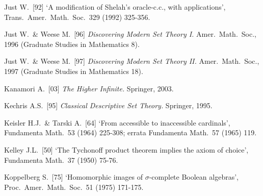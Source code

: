 {%


Just W.\ [92] `A modification of Shelah's oracle-c.c., with
applications', Trans.\ Amer.\ Math.\ Soc.\ 329 (1992) 325-356.
\cmmnt{[527M.]}


Just W.\ \& Weese M.\ [96] {\it Discovering Modern Set Theory I.}
Amer.\ Math.\ Soc., 1996 (Graduate Studies in Mathematics 8).
\cmmnt{[{\it Intro.}.]}

Just W.\ \& Weese M.\ [97] {\it Discovering Modern Set Theory II.}
Amer.\ Math.\ Soc., 1997 (Graduate Studies in Mathematics 18).
\cmmnt{[5A1B, 5A1F, 5A1H.]}

\medskip%




Kanamori A.\ [03] {\it The Higher Infinite.}   Springer, 2003.

Kechris A.S.\ [95] {\it Classical Descriptive Set Theory.}  Springer,
1995.
\cmmnt{[5A1D, \S567 {\it notes\/}.]}

Keisler H.J.\ \& Tarski A.\ [64] `From accessible to
inaccessible cardinals', Fundamenta Math.\ 53 (1964) 225-308;  errata
Fundamenta Math.\ 57 (1965) 119.

Kelley J.L.\ [50] `The Tychonoff product theorem implies the axiom of
choice', Fundamenta Math.\ 37 (1950) 75-76.
\cmmnt{[561D.]}

Koppelberg S.\ [75]
`Homomorphic images of $\sigma$-complete Boolean algebras',
Proc.\ Amer.\ Math.\ Soc.\ 51 (1975) 171-175.
\cmmnt{[515L.]}

}
